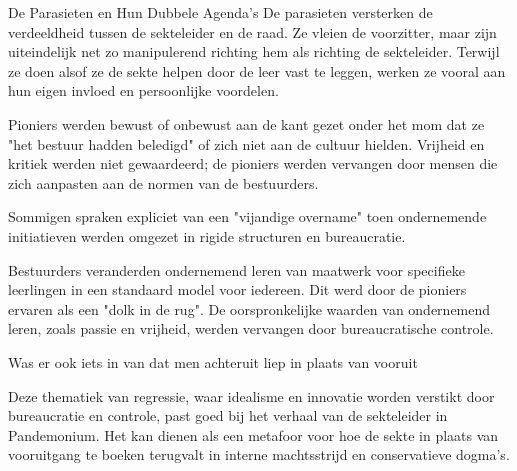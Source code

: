 De Parasieten en Hun Dubbele Agenda’s
De parasieten versterken de verdeeldheid tussen de sekteleider en de raad. Ze vleien de voorzitter, maar zijn uiteindelijk net zo manipulerend richting hem als richting de sekteleider.
Terwijl ze doen alsof ze de sekte helpen door de leer vast te leggen, werken ze vooral aan hun eigen invloed en persoonlijke voordelen.

Pioniers werden bewust of onbewust aan de kant gezet onder het mom dat ze "het bestuur hadden beledigd" of zich niet aan de cultuur hielden.
Vrijheid en kritiek werden niet gewaardeerd; de pioniers werden vervangen door mensen die zich aanpasten aan de normen van de bestuurders.

Sommigen spraken expliciet van een "vijandige overname" toen ondernemende initiatieven werden omgezet in rigide structuren en bureaucratie.

Bestuurders veranderden ondernemend leren van maatwerk voor specifieke leerlingen in een standaard model voor iedereen. Dit werd door de pioniers ervaren als een "dolk in de rug".
De oorspronkelijke waarden van ondernemend leren, zoals passie en vrijheid, werden vervangen door bureaucratische controle.

Was er ook iets in van dat men achteruit liep in plaats van vooruit

Deze thematiek van regressie, waar idealisme en innovatie worden verstikt door bureaucratie en controle, past goed bij het verhaal van de sekteleider in Pandemonium. Het kan dienen als een metafoor voor hoe de sekte in plaats van vooruitgang te boeken terugvalt in interne machtsstrijd en conservatieve dogma's.
